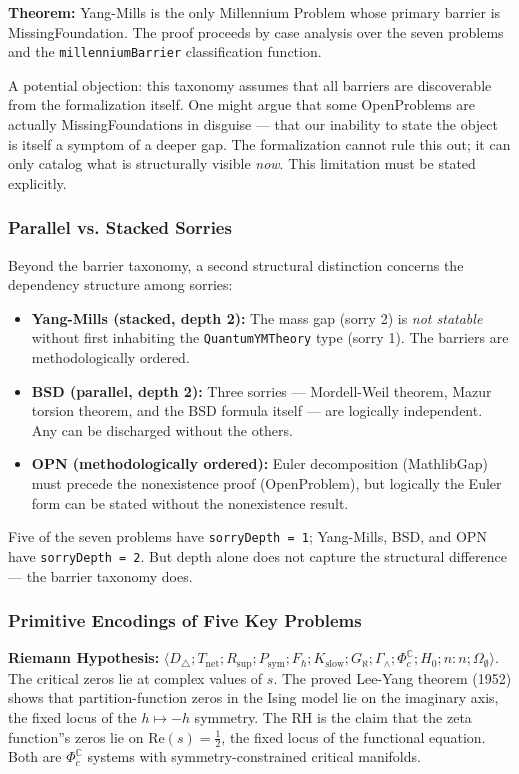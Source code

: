 \documentclass[12pt,a4paper]{article}
\begin{document}
\textbf{Theorem:} Yang-Mills is the only Millennium Problem whose primary barrier is MissingFoundation. The proof proceeds by case analysis over the seven problems and the \texttt{millenniumBarrier} classification function.

A potential objection: this taxonomy assumes that all barriers are discoverable from the formalization itself. One might argue that some OpenProblems are actually MissingFoundations in disguise --- that our inability to state the object is itself a symptom of a deeper gap. The formalization cannot rule this out; it can only catalog what is structurally visible \emph{now}. This limitation must be stated explicitly.

\subsubsection{Parallel vs. Stacked Sorries}

Beyond the barrier taxonomy, a second structural distinction concerns the dependency structure among sorries:

\begin{itemize}
    \item \textbf{Yang-Mills (stacked, depth 2):} The mass gap (sorry 2) is \emph{not statable} without first inhabiting the \texttt{QuantumYMTheory} type (sorry 1). The barriers are methodologically ordered.
    \item \textbf{BSD (parallel, depth 2):} Three sorries --- Mordell-Weil theorem, Mazur torsion theorem, and the BSD formula itself --- are logically independent. Any can be discharged without the others.
    \item \textbf{OPN (methodologically ordered):} Euler decomposition (MathlibGap) must precede the nonexistence proof (OpenProblem), but logically the Euler form can be stated without the nonexistence result.
\end{itemize}

Five of the seven problems have \texttt{sorryDepth = 1}; Yang-Mills, BSD, and OPN have \texttt{sorryDepth = 2}. But depth alone does not capture the structural difference --- the barrier taxonomy does.

\subsubsection{Primitive Encodings of Five Key Problems}

\textbf{Riemann Hypothesis:} $\langle D_{\triangle}; T_{\text{net}}; R_{\text{sup}}; P_{\text{sym}}; F_{\hbar}; K_{\text{slow}}; G_{\aleph}; \Gamma_{\wedge}; \Phi_c^\mathbb{C}; H_0; n{:}n; \Omega_{\emptyset} \rangle$. The critical zeros lie at complex values of $s$. The proved Lee-Yang theorem (1952) shows that partition-function zeros in the Ising model lie on the imaginary axis, the fixed locus of the $h \mapsto -h$ symmetry. The RH is the claim that the zeta function''s zeros lie on $\text{Re}(s) = \frac{1}{2}$, the fixed locus of the functional equation. Both are $\Phi_c^\mathbb{C}$ systems with symmetry-constrained critical manifolds.
\end{document}
